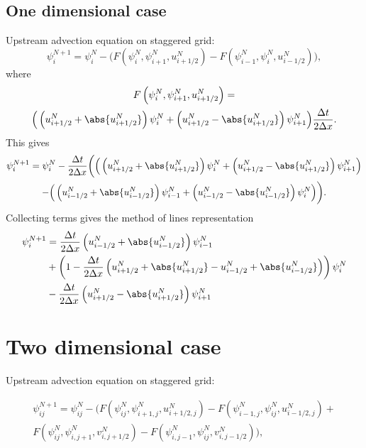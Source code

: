 
\subsection{One dimensional case}

Upstream advection equation on staggered grid:
\begin{equation}
 \psi_i^{N+1} = \psi_i^N - \Big( F \left( \psi_i^N,\psi_{i+1}^N,u_{i+1/2}^N\right)
-F \left( \psi_{i-1}^N,\psi_{i}^N,u_{i-1/2}^N\right) \Big),
\end{equation}
where
\begin{multline}
F \left( \psi_i^N,\psi_{i+1}^N,u_{i+1/2}^N\right) =\\
\Big( \left( u_{i+1/2}^N + \abs{u_{i+1/2}^N} \right) \psi_i^N
+ \left( u_{i+1/2}^N - \abs{u_{i+1/2}^N} \right) \psi_{i+1}^N \Big)
\frac{\Delta t}{2 \Delta x}.
\end{multline}
This gives
\begin{multline}
\psi_i^{N+1} = \psi_i^N - \frac{\Delta t}{2 \Delta x} \bigg( \Big( \left( u_{i+1/2}^N + \abs{u_{i+1/2}^N} \right) \psi_i^N
+ \left( u_{i+1/2}^N - \abs{u_{i+1/2}^N} \right) \psi_{i+1}^N \Big)
\\
- \Big( \left( u_{i-1/2}^N + \abs{u_{i-1/2}^N} \right) \psi_{i-1}^N
+ \left( u_{i-1/2}^N - \abs{u_{i-1/2}^N} \right) \psi_{i}^N \Big) \bigg).
\end{multline}
Collecting terms gives the method of lines representation
\begin{equation}
\begin{split}
\psi_i^{N+1} &=
\frac{\Delta t}{2 \Delta x} \left( u_{i-1/2}^N + \abs{u_{i-1/2}^N} \right) \psi_{i-1}^N\\
&+ \left(1 - \frac{\Delta t}{2 \Delta x} \left( u_{i+1/2}^N + \abs{u_{i+1/2}^N} - u_{i-1/2}^N + \abs{u_{i-1/2}^N} \right) \right) \psi_i^N\\
&-\frac{\Delta t}{2 \Delta x} \left( u_{i+1/2}^N - \abs{u_{i+1/2}^N} \right) \psi_{i+1}^N\\
\end{split}
\end{equation}

\section*{Two dimensional case}
Upstream advection equation on staggered grid:

\begin{multline}
 \psi_{ij}^{N+1} = \psi_{ij}^N - \Big( F \left( \psi_{ij}^N,\psi_{i+1,j}^N,u_{i+1/2,j}^N\right)
-F \left( \psi_{i-1,j}^N,\psi_{ij}^N,u_{i-1/2,j}^N\right) + \\ F \left( \psi_{ij}^N,\psi_{i,j+1}^N,v_{i,j+1/2}^N\right) -F \left( \psi_{i,j-1}^N,\psi_{ij}^N,v_{i,j-1/2}^N\right) \Big),
\end{multline}

